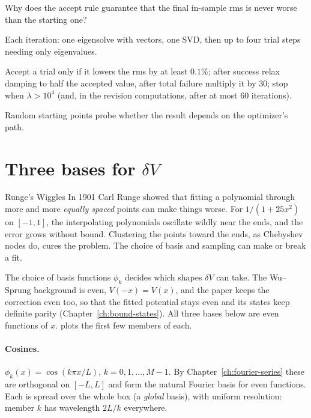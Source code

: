 \begin{checkpoint}
Why does the accept rule guarantee that the final in-sample rms is never worse than the starting one?
\end{checkpoint}

\begin{keyideas}
\item Each iteration: one eigensolve with vectors, one SVD, then up to four trial steps needing only eigenvalues.
\item Accept a trial only if it lowers the rms by at least $0.1\%$; after success relax damping to half the accepted value, after total failure multiply it by 30; stop when $\lambda>10^4$ (and, in the revision computations, after at most 60 iterations).
\item Random starting points probe whether the result depends on the optimizer's path.
\end{keyideas}

\section{Three bases for $\delta V$}\label{sec:fitting-bases}
\begin{didyouknow}{Runge's Wiggles}
In 1901 Carl Runge showed that fitting a polynomial through more and more \emph{equally spaced} points can make things worse. For $1/(1+25x^2)$ on $[-1,1]$, the interpolating polynomials oscillate wildly near the ends, and the error grows without bound. Clustering the points toward the ends, as Chebyshev nodes do, cures the problem. The choice of basis and sampling can make or break a fit.
\end{didyouknow}

The choice of basis functions $\phi_k$ decides which shapes $\delta V$ can take. The Wu--Sprung background is even, $V(-x)=V(x)$, and the paper keeps the correction even too, so that the fitted potential stays even and its states keep definite parity (Chapter~\ref{ch:bound-states}). All three bases below are even functions of $x$.  plots the first few members of each.

\paragraph{Cosines.} $\phi_k(x)=\cos(k\pi x/L)$, $k=0,1,\dots,M-1$. By Chapter~\ref{ch:fourier-series} these are orthogonal on $[-L,L]$ and form the natural Fourier basis for even functions. Each is spread over the whole box (a \emph{global} basis), with uniform resolution: member $k$ has wavelength $2L/k$ everywhere.

